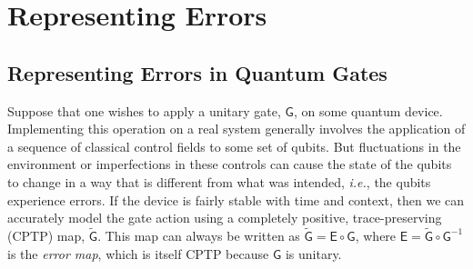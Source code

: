 \documentclass[aps,nofootinbib,pra,notitlepage,twocolumn]{revtex4-1}
\newcommand{\note}[1]{}
\begin{document}






\section{Representing Errors }
\label{sec:representing_quantum_gates}

\subsection{Representing Errors in Quantum Gates}
\noindent Suppose that one wishes to apply a unitary gate, $\mathsf{G}$, on some quantum device. Implementing this operation on a real system generally involves the application of a sequence of classical control fields to some set of qubits.  But fluctuations in the environment or imperfections in these controls can cause the state of the qubits to change in a way that is different from what was intended, \emph{i.e.}, the qubits experience errors. If the device is fairly stable with time and context\cite{1810.05651}, then we can accurately model the gate action using a completely positive, trace-preserving (CPTP) map, $\mathsf{\tilde G}$. This map can always be written as $\mathsf{\tilde G} = \mathsf{E}\circ\mathsf{G}$, where $\mathsf{E} = \mathsf{\tilde G}\circ\mathsf{G}^{-1}$ is the \emph{error map}, which is itself CPTP because $\mathsf{G}$ is unitary.
\end{document}
